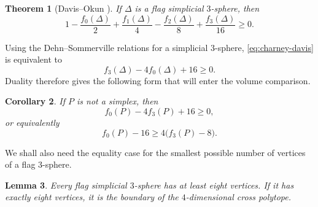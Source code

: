 \documentclass[12pt,a4paper]{article}
\theoremstyle{thmstyleone}
\newtheorem{theorem}{Theorem}[section]
\newtheorem{lemma}[theorem]{Lemma}
\newtheorem{corollary}[theorem]{Corollary}
\theoremstyle{thmstylethree}
\theoremstyle{thmstyletwo}
\begin{document}
\begin{theorem}[Davis--Okun \cite{DavisOkun2001}]\label{thm:davis-okun}
If $\Delta$ is a flag simplicial $3$-sphere, then
\begin{equation}\label{eq:charney-davis}
 1-\frac{f_0(\Delta)}2+\frac{f_1(\Delta)}4
 -\frac{f_2(\Delta)}8+\frac{f_3(\Delta)}{16}\geq0.
\end{equation}
\end{theorem}

Using the Dehn--Sommerville relations for a simplicial $3$-sphere,
\eqref{eq:charney-davis} is equivalent to
\begin{equation}\label{eq:CD-short}
 f_3(\Delta)-4f_0(\Delta)+16\geq0.
\end{equation}
Duality therefore gives the following form that will enter the volume
comparison.

\begin{corollary}\label{cor:f-inequality}
If $P$ is not a simplex, then
\begin{equation}\label{eq:primal-CD}
 f_0(P)-4f_3(P)+16\geq0,
\end{equation}
or equivalently
\begin{equation}\label{eq:primal-CD-shift}
 f_0(P)-16\geq4\bigl(f_3(P)-8\bigr).
\end{equation}
\end{corollary}

We shall also need the equality case for the smallest possible number of
vertices of a flag $3$-sphere.

\begin{lemma}\label{lem:flag-eight}
Every flag simplicial $3$-sphere has at least eight vertices.  If it has
exactly eight vertices, it is the boundary of the $4$-dimensional cross
polytope.
\end{lemma}
\end{document}

